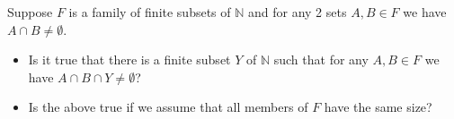 Suppose \(F\) is a family of finite subsets of \(\mathbb{N}\) and for any 2 sets \(A,B \in F\) we have \(A \cap B \not= \emptyset\).
\begin{itemize}

\item[(a)] Is it true that there is a finite subset \(Y\) of \(\mathbb{N}\) such that for any \(A,B \in F\) we have \(A\cap B\cap Y \not= \emptyset\)?
\item[(b)] Is the above true if we assume that all members of \(F\) have the same size?
\end{itemize}
